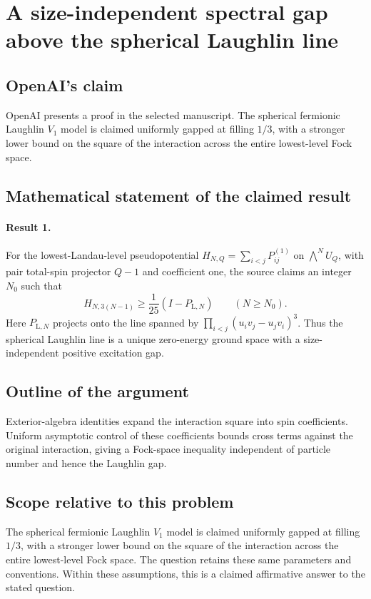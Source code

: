 \documentclass[11pt]{article}
\begin{document}
\section*{A size-independent spectral gap above the spherical Laughlin line}

\subsection{OpenAI's claim}
OpenAI presents a proof in the selected manuscript. The spherical fermionic Laughlin $V_1$ model is claimed uniformly gapped at filling $1/3$, with a stronger lower bound on the square of the interaction across the entire lowest-level Fock space.

\subsection{Mathematical statement of the claimed result}
\paragraph{Result 1.} For the lowest-Landau-level pseudopotential \(H_{N,Q}=\sum_{i<j}P_{ij}^{(1)}\) on \(\bigwedge^NU_Q\), with pair total-spin projector \(Q-1\) and coefficient one, the source claims an integer \(N_0\) such that
\[
 H_{N,3(N-1)}\ge\frac1{25}(I-P_{\mathrm L,N})\qquad(N\ge N_0).
\]
Here \(P_{\mathrm L,N}\) projects onto the line spanned by \(\prod_{i<j}(u_iv_j-u_jv_i)^3\). Thus the spherical Laughlin line is a unique zero-energy ground space with a size-independent positive excitation gap.

\subsection{Outline of the argument}
Exterior-algebra identities expand the interaction square into spin coefficients. Uniform asymptotic control of these coefficients bounds cross terms against the original interaction, giving a Fock-space inequality independent of particle number and hence the Laughlin gap.

\subsection{Scope relative to this problem}
The spherical fermionic Laughlin $V_1$ model is claimed uniformly gapped at filling $1/3$, with a stronger lower bound on the square of the interaction across the entire lowest-level Fock space. The question retains these same parameters and conventions. Within these assumptions, this is a claimed affirmative answer to the stated question.
\end{document}

